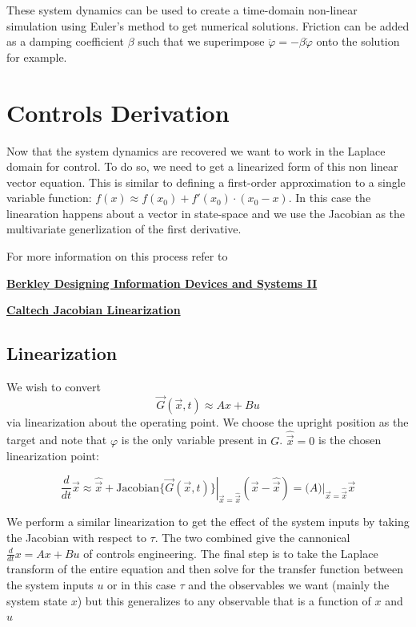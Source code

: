\documentclass[11pt]{article}
\begin{document}
These system dynamics can be used to create a time-domain non-linear simulation using Euler's method to get numerical solutions. Friction can be added as a damping coefficient $\beta$ such that we superimpose $\ddot{\varphi} = - \beta \dot{\varphi}$ onto the solution for example.

\section{Controls Derivation}

Now that the system dynamics are recovered we want to work in the Laplace domain for control. To do so, we need to get a linearized form of this non linear vector equation. This is similar to defining a first-order approximation to a single variable function: $f(x) \approx f(x_0) + f'(x_0)\cdot (x_0 - x)$. In this case the linearation happens about a vector in state-space and we use the Jacobian as the multivariate generlization of the first derivative.

For more information on this process refer to 

\textbf{\href{https://inst.eecs.berkeley.edu/~ee16b/sp21/notes/sp21/note15.pdf}{Berkley Designing Information Devices and Systems II}} \cite{berkeley2021designing}

\textbf{\href{https://www.cds.caltech.edu/~murray/courses/cds101/fa02/caltech/pph02-ch19-23.pdf}{Caltech Jacobian Linearization}} \cite{caltech2002jacobian}

\subsection{Linearization}
We wish to convert $$\vec{G}(\vec{x}, t) \approx Ax + Bu$$
via linearization about the operating point. We choose the upright position as the target and note that $\varphi$ is the only variable present in $G$. $\hat{\vec{x}}=0$ is the chosen linearization point:

\[
\frac{d}{dt}\vec{x} \approx \hat{\vec{x}} + \left. \text{Jacobian}\{\vec{G}(\vec{x}, t)\} \right|_{\vec{x}=\hat{\vec{x}}} (\vec{x}-\hat{\vec{x}}) = \left. \Big(A\Big) \right|_{\vec{x}=\hat{\vec{x}}} \vec{x}
\]

We perform a similar linearization to get the effect of the system inputs by taking the Jacobian with respect to $\tau$. The two combined give the cannonical $\frac{d}{dt}x = Ax + Bu$ of controls engineering. The final step is to take the Laplace transform of the entire equation and then solve for the transfer function between the system inputs $u$ or in this case $\tau$ and the observables we want (mainly the system state $x$) but this generalizes to any observable that is a function of $x$ and $u$
\end{document}
